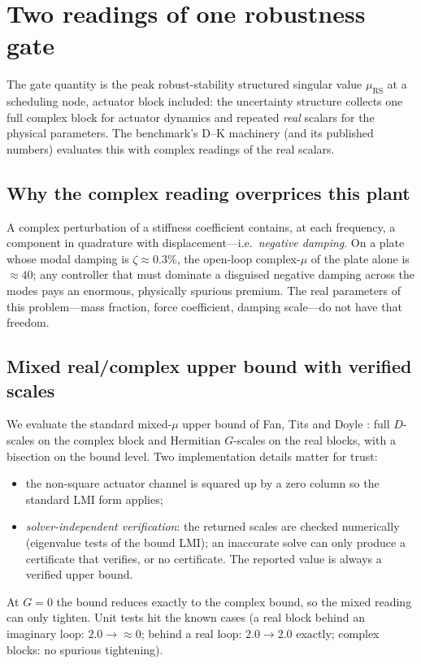 \documentclass[preprint,12pt]{elsarticle}
\newcommand{\muRS}{\mu_{\mathrm{RS}}}
\begin{document}
\section{Two readings of one robustness gate}
\label{sec:readings}

The gate quantity is the peak robust-stability structured singular
value $\muRS$ at a scheduling node, actuator block included: the
uncertainty structure collects one full complex block for actuator
dynamics and repeated \emph{real} scalars for the physical parameters.
The benchmark's D--K machinery (and its published numbers) evaluates
this with complex readings of the real scalars.

\subsection{Why the complex reading overprices this plant}

A complex perturbation of a stiffness coefficient contains, at each
frequency, a component in quadrature with displacement---i.e.\
\emph{negative damping}.  On a plate whose modal damping is
$\zeta\approx 0.3\%$, the open-loop complex-$\mu$ of the plate alone is
$\approx 40$; any controller that must dominate a disguised negative
damping across the modes pays an enormous, physically spurious premium.
The real parameters of this problem---mass fraction, force coefficient,
damping scale---do not have that freedom.

\subsection{Mixed real/complex upper bound with verified scales}

We evaluate the standard mixed-$\mu$ upper bound of Fan, Tits and Doyle
\cite{Fan1991,Young1992}: full $D$-scales on the complex block and
Hermitian $G$-scales on the real blocks, with a bisection on the bound
level.  Two implementation details matter for trust:
\begin{itemize}
\item the non-square actuator channel is squared up by a zero column so
the standard LMI form applies;
\item \emph{solver-independent verification}: the returned scales are
checked numerically (eigenvalue tests of the bound LMI); an inaccurate
solve can only produce a certificate that verifies, or no certificate.
The reported value is always a verified upper bound.
\end{itemize}
At $G=0$ the bound reduces exactly to the complex bound, so the mixed
reading can only tighten.  Unit tests hit the known cases (a real block
behind an imaginary loop: $2.0 \to \approx 0$; behind a real loop:
$2.0 \to 2.0$ exactly; complex blocks: no spurious tightening).
\end{document}
